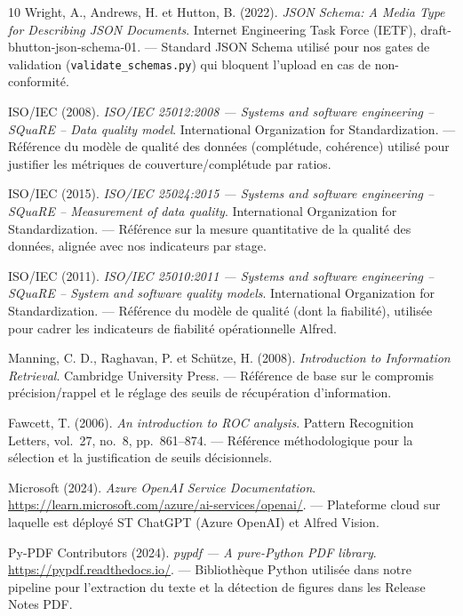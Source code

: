 \documentclass[12pt,a4paper]{report}
\begin{document}
\begin{thebibliography}{10}
Wright, A., Andrews, H. et Hutton, B. (2022). \textit{JSON Schema: A Media Type for Describing JSON Documents}. Internet Engineering Task Force (IETF), draft-bhutton-json-schema-01. --- Standard JSON Schema utilisé pour nos gates de validation (\texttt{validate\_schemas.py}) qui bloquent l'upload en cas de non-conformité.

ISO/IEC (2008). \textit{ISO/IEC 25012:2008 --- Systems and software engineering -- SQuaRE -- Data quality model}. International Organization for Standardization. --- Référence du modèle de qualité des données (complétude, cohérence) utilisé pour justifier les métriques de couverture/complétude par ratios.

ISO/IEC (2015). \textit{ISO/IEC 25024:2015 --- Systems and software engineering -- SQuaRE -- Measurement of data quality}. International Organization for Standardization. --- Référence sur la mesure quantitative de la qualité des données, alignée avec nos indicateurs par stage.

ISO/IEC (2011). \textit{ISO/IEC 25010:2011 --- Systems and software engineering -- SQuaRE -- System and software quality models}. International Organization for Standardization. --- Référence du modèle de qualité (dont la fiabilité), utilisée pour cadrer les indicateurs de fiabilité opérationnelle Alfred.

Manning, C. D., Raghavan, P. et Schütze, H. (2008). \textit{Introduction to Information Retrieval}. Cambridge University Press. --- Référence de base sur le compromis précision/rappel et le réglage des seuils de récupération d'information.

Fawcett, T. (2006). \textit{An introduction to ROC analysis}. Pattern Recognition Letters, vol.~27, no.~8, pp.~861--874. --- Référence méthodologique pour la sélection et la justification de seuils décisionnels.

Microsoft (2024). \textit{Azure OpenAI Service Documentation}. \url{https://learn.microsoft.com/azure/ai-services/openai/}. --- Plateforme cloud sur laquelle est déployé ST ChatGPT (Azure OpenAI) et Alfred Vision.

Py-PDF Contributors (2024). \textit{pypdf --- A pure-Python PDF library}. \url{https://pypdf.readthedocs.io/}. --- Bibliothèque Python utilisée dans notre pipeline pour l'extraction du texte et la détection de figures dans les Release Notes PDF.


\end{thebibliography}
\end{document}
